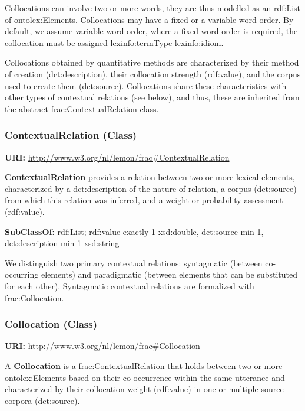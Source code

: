 \documentclass[a4paper]{article}
\newcommand\textstyleStrongEmphasis[1]{\textbf{#1}}
\newcommand\textstyleTeletype[1]{\textrm{#1}}
\begin{document}
Collocations can involve two or more words, they are thus modelled as an \textstyleTeletype{rdf:List} of \textstyleTeletype{ontolex:Element}s. Collocations may have a fixed or a variable word order. By default, we assume variable word order, where a fixed word order is required, the collocation must be assigned \textstyleTeletype{lexinfo:termType lexinfo:idiom}.

Collocations obtained by quantitative methods are characterized by their method of creation (\textstyleTeletype{dct:description}), their collocation strength (\textstyleTeletype{rdf:value}), and the corpus used to create them (\textstyleTeletype{dct:source}). Collocations share these characteristics with other types of contextual relations (see below), and thus, these are inherited from the abstract \textstyleTeletype{frac:ContextualRelation} class.

\subsubsection[ContextualRelation (Class)]{ContextualRelation (Class)}
\textstyleStrongEmphasis{URI:} \url{http://www.w3.org/nl/lemon/frac#ContextualRelation}

\textstyleStrongEmphasis{ContextualRelation} provides a relation between two or more lexical elements, characterized by a \textstyleTeletype{dct:description} of the nature of relation, a corpus (\textstyleTeletype{dct:source}) from which this relation was inferred, and a weight or probability assessment (\textstyleTeletype{rdf:value}).

\textstyleStrongEmphasis{SubClassOf:} rdf:List; rdf:value exactly 1 xsd:double, dct:source min 1, dct:description min 1 xsd:string

We distinguish two primary contextual relations: syntagmatic (between co-occurring elements) and paradigmatic (between elements that can be substituted for each other). Syntagmatic contextual relations are formalized with \textstyleTeletype{frac:Collocation}.

\subsubsection[Collocation (Class)]{Collocation (Class)}
\textstyleStrongEmphasis{URI:} \url{http://www.w3.org/nl/lemon/frac#Collocation}

A \textstyleStrongEmphasis{Collocation} is a \textstyleTeletype{frac:ContextualRelation} that holds between two or more \textstyleTeletype{ontolex:Element}s based on their co-occurrence within the same utterance and characterized by their collocation weight (\textstyleTeletype{rdf:value}) in one or multiple source corpora (\textstyleTeletype{dct:source}). 
\end{document}
